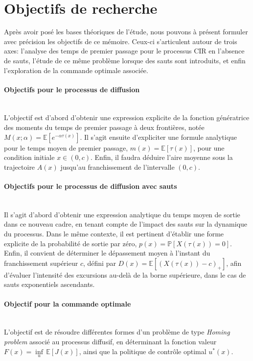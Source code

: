 \clearpage

\section{Objectifs de recherche}  %

Après avoir posé les bases théoriques de l'étude, nous pouvons à présent formuler avec précision les objectifs de ce mémoire. Ceux-ci s'articulent autour de trois axes: l'analyse des temps de premier passage pour le processus \acs{CIR} en l'absence de sauts, l'étude de ce même problème lorsque des sauts sont introduits, et enfin l'exploration de la commande optimale associée.
\paragraph{Objectifs pour le processus de diffusion}\phantom{}\\
L'objectif est d'abord d'obtenir une expression explicite de la fonction génératrice des moments du temps de premier passage à deux frontières, notée \( M(x;\alpha) = \mathds{E}[e^{-\alpha \tau(x)}] \). Il s'agit ensuite d'expliciter une formule analytique pour le temps moyen de premier passage, \( m(x) = \mathds{E}[\tau(x)] \), pour une condition initiale \( x \in (0,c) \). Enfin, il faudra déduire l'aire moyenne sous la trajectoire \( A(x) \) jusqu'au franchissement de l'intervalle \( (0,c) \).

\paragraph{Objectifs pour le processus de diffusion avec sauts}\phantom{}\\
Il s'agit d'abord d'obtenir une expression analytique du temps moyen de sortie dans ce nouveau cadre, en tenant compte de l'impact des sauts sur la dynamique du processus. Dans le même contexte, il est pertinent d'établir une forme explicite de la probabilité de sortie par zéro, \( p(x) = \mathds{P}[X(\tau(x)) = 0] \). Enfin, il convient de déterminer le dépassement moyen à l'instant du franchissement supérieur \( c \), défini par \( D(x) = \mathds{E}[{(X(\tau(x)) - c)}_+] \), afin d'évaluer l'intensité des excursions au-delà de la borne supérieure, dans le cas de sauts exponentiels ascendants.

\paragraph{Objectif pour la commande optimale}\phantom{}\\
L'objectif est de résoudre différentes formes d'un problème de type \textit{Homing problem} associé au processus diffusif, en déterminant la fonction valeur \( F(x) = \underset{u}{\inf}\,\mathds{E}[J(x)] \), ainsi que la politique de contrôle optimal \( u^*(x) \).

